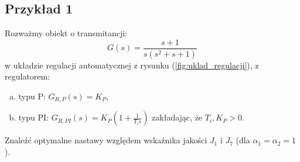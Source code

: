 \documentclass{article}
\begin{document}
    \subsection{Przykład 1}
    Rozważmy obiekt o transmitancji:
    $$
        G(s) = \frac{s+1}{s(s^2 + s + 1)}
    $$
    w układzie regulacji automatycznej z rysunku (\ref{fig:uklad_regulacji}), z regulatorem:
    \begin{enumerate}[(a)]
        \item typu P: $G_{R,P}(s) = K_{P}$,
        \item typu PI: $G_{R,PI}(s) = K_{P}(1 + \frac{1}{T_{i}s})$ zakładając, że $T_{i}, K_{P} > 0$.
    \end{enumerate}
    Znaleźć optymalne nastawy względem wskaźnika jakości $J_{1}$ i $J_{7}$ (dla $\alpha_{1} = \alpha_{2} = 1$).
\end{document}
